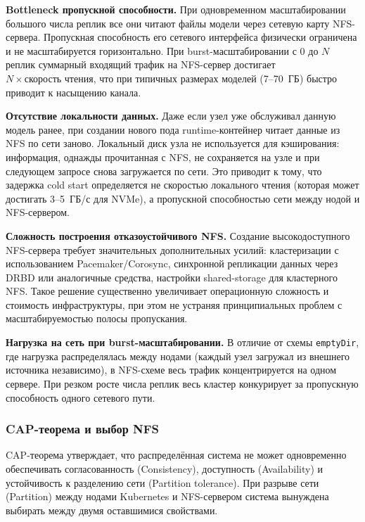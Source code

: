 \textbf{Bottleneck пропускной способности.} При одновременном масштабировании большого числа реплик все они читают файлы модели через сетевую карту NFS-сервера. Пропускная способность его сетевого интерфейса физически ограничена и не масштабируется горизонтально. При burst-масштабировании с 0 до $N$ реплик суммарный входящий трафик на NFS-сервер достигает $N \times \text{скорость чтения}$, что при типичных размерах моделей (7--70~ГБ) быстро приводит к насыщению канала.

\textbf{Отсутствие локальности данных.} Даже если узел уже обслуживал данную модель ранее, при создании нового пода runtime-контейнер читает данные из NFS по сети заново. Локальный диск узла не используется для кэширования: информация, однажды прочитанная с NFS, не сохраняется на узле и при следующем запросе снова загружается по сети. Это приводит к тому, что задержка cold start определяется не скоростью локального чтения (которая может достигать 3--5~ГБ/с для NVMe), а пропускной способностью сети между нодой и NFS-сервером.

\textbf{Сложность построения отказоустойчивого NFS.} Создание высокодоступного NFS-сервера требует значительных дополнительных усилий: кластеризации с использованием Pacemaker/Corosync, синхронной репликации данных через DRBD или аналогичные средства, настройки shared-storage для кластерного NFS. Такое решение существенно увеличивает операционную сложность и стоимость инфраструктуры, при этом не устраняя принципиальных проблем с масштабируемостью полосы пропускания.

\textbf{Нагрузка на сеть при burst-масштабировании.} В отличие от схемы \texttt{emptyDir}, где нагрузка распределялась между нодами (каждый узел загружал из внешнего источника независимо), в NFS-схеме весь трафик концентрируется на одном сервере. При резком росте числа реплик весь кластер конкурирует за пропускную способность одного сетевого пути.

\subsubsection*{CAP-теорема и выбор NFS}

CAP-теорема \cite{brewer2000cap} утверждает, что распределённая система не может одновременно обеспечивать согласованность (Consistency), доступность (Availability) и устойчивость к разделению сети (Partition tolerance). При разрыве сети (Partition) между нодами Kubernetes и NFS-сервером система вынуждена выбирать между двумя оставшимися свойствами.

